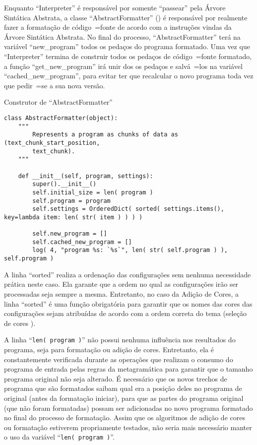 Enquanto ``Interpreter'' é responsável por somente ``passear'' pela Árvore Sintática Abstrata,
a classe ``AbstractFormatter'' () é responsável por realmente fazer a formatação de código~=fonte de acordo com a instruções vindas da Árvore Sintática Abstrata.
No final do processo,
``AbstractFormatter'' terá na variável ``new\_program'' todos os pedaços do programa formatado.
Uma vez que ``Interpreter'' termina de construir todos os pedaços de código~=fonte formatado,
a função ``get\_new\_program'' irá unir dos os pedaços e
salvá~=los na variável ``cached\_new\_program'',
para evitar ter que recalcular o novo programa toda vez que pedir~=se a sua nova versão.
\begin{code}
\caption{Construtor de ``AbstractFormatter''}
\label{construtorDeParsedProgram}
\begin{verbatim}
class AbstractFormatter(object):
    """
        Represents a program as chunks of data as (text_chunk_start_position,
        text_chunk).
    """

    def __init__(self, program, settings):
        super().__init__()
        self.initial_size = len( program )
        self.program = program
        self.settings = OrderedDict( sorted( settings.items(), key=lambda item: len( str( item ) ) ) )

        self.new_program = []
        self.cached_new_program = []
        log( 4, "program %s: `%s`", len( str( self.program ) ), self.program )
\end{verbatim}
\end{code}

A linha ``sorted'' realiza a ordenação das configurações sem nenhuma necessidade prática neste caso.
Ela garante que a ordem no qual as configurações irão ser processadas seja sempre a mesma.
Entretanto,
no caso da Adição de Cores,
a linha ``sorted'' é uma função obrigatória para garantir que os nomes das cores das configurações sejam atribuídas de acordo com a ordem correta do tema (seleção de cores \cite{vsCodeSyntaxHighlighthing,sublimeTextScopeNaming}).

A linha ``\texttt{len( program )}'' não possui nenhuma influência nos resultados do programa,
seja para formatação ou
adição de cores.
Entretanto,
ela é constantemente verificada durante as operações que realizam o consumo do programa de entrada pelas regras da metagramática para garantir que o tamanho programa original não seja alterado.
É necessário que os novos trechos de programa que são formatados saibam qual era a posição deles no programa de original (antes da formatação iniciar),
para que as partes do programa original (que não foram formatadas) possam ser adicionadas no novo programa formatado no final do processo de formatação.
Assim que os algoritmos de adição de cores ou
formatação estiverem propriamente testados,
não seria mais necessário manter o uso da variável ``\texttt{len( program )}''.

